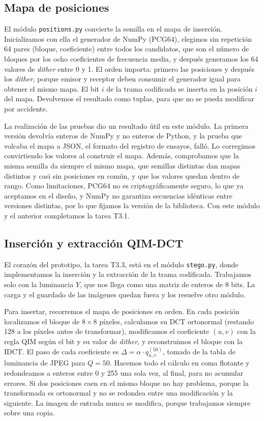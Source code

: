 \documentclass[IB]{TFUOC}%
\begin{document}
\subsection{Mapa de posiciones}
\label{subsec:impl_positions}

El módulo \texttt{positions.py} convierte la semilla en el mapa de inserción. Inicializamos con ella el generador
de NumPy (PCG64), elegimos sin repetición 64 pares (bloque, coeficiente) entre todos los candidatos,
que son el número de bloques por los ocho coeficientes de frecuencia media, y después generamos los 64 valores de \textit{dither} entre 0 y 1. El orden importa: primero las posiciones y después los \textit{dither}, porque emisor y receptor deben consumir el generador igual para obtener el mismo mapa. El bit $i$ de la trama codificada se inserta en la posición $i$ del mapa. Devolvemos el resultado como tuplas, para que no se pueda modificar por accidente.

La realización de las pruebas dio un resultado útil en este módulo. La primera versión devolvía enteros de NumPy y no enteros de Python, y la prueba que volcaba el mapa a JSON, el formato del registro de ensayos, falló. Lo corregimos convirtiendo los valores al construir el mapa. Además, comprobamos que la misma semilla da siempre el mismo mapa, que semillas distintas dan mapas distintos y casi sin posiciones en común, y que los valores quedan dentro de rango. Como limitaciones, PCG64 no es criptográficamente seguro, lo que ya aceptamos en el diseño, y NumPy no garantiza secuencias idénticas entre versiones distintas, por lo que fijamos la versión de la biblioteca. Con este módulo y el anterior completamos la tarea T3.1.

\subsection{Inserción y extracción QIM-DCT}
\label{subsec:impl_stego}

El corazón del prototipo, la tarea T3.3, está en el módulo \texttt{stego.py}, donde implementamos la inserción y la extracción de la trama codificada. Trabajamos solo 
con la luminancia $Y$, que nos llega como una matriz de enteros de 8 bits. La carga y el guardado 
de las imágenes quedan fuera y los resuelve otro módulo.

Para insertar, recorremos el mapa de posiciones en orden. En cada posición localizamos el 
bloque de $8 \times 8$ píxeles, calculamos su DCT ortonormal (restando 128 a los píxeles antes de 
transformar), modificamos el coeficiente $(u,v)$ con la regla QIM según el bit y su 
valor de \textit{dither}, y reconstruimos el bloque con la IDCT. El paso de cada coeficiente 
es $\Delta = \alpha \cdot q^{(50)}_{u,v}$, tomado de la tabla de luminancia de JPEG 
para $Q=50$. Hacemos todo el cálculo en coma flotante y redondeamos a enteros entre 0 y 
255 una sola vez, al final, para no acumular errores. Si dos posiciones caen en el mismo bloque 
no hay problema, porque la transformada es ortonormal y no se redondea entre una modificación y 
la siguiente. La imagen de entrada nunca se modifica, porque trabajamos siempre sobre una copia.
\end{document}
